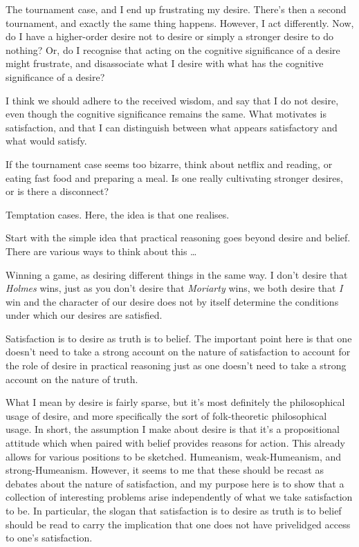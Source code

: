 \documentclass[10pt]{article}
\begin{document}
The tournament case, and I end up frustrating my desire.
There's then a second tournament, and exactly the same thing happens.
However, I act differently.
Now, do I have a higher-order desire not to desire or simply a stronger desire to do nothing?
Or, do I recognise that acting on the cognitive significance of a desire might frustrate, and disassociate what I desire with what has the cognitive significance of a desire?

I think we should adhere to the received wisdom, and say that I do not desire, even though the cognitive significance remains the same.
What motivates is satisfaction, and that I can distinguish between what appears satisfactory and what would satisfy.

If the tournament case seems too bizarre, think about netflix and reading, or eating fast food and preparing a meal.
Is one really cultivating stronger desires, or is there a disconnect?

Temptation cases.
Here, the idea is that one realises.








Start with the simple idea that practical reasoning goes beyond desire and belief.
There are various ways to think about this \dots



Winning a game, as desiring different things in the same way.
I don't desire that \emph{Holmes} wins, just as you don't desire that \emph{Moriarty} wins, we both desire that \emph{I} win and the character of our desire does not by itself determine the conditions under which our desires are satisfied.



Satisfaction is to desire as truth is to belief.
The important point here is that one doesn't need to take a strong account on the nature of satisfaction to account for the role of desire in practical reasoning just as one doesn't need to take a strong account on the nature of truth.

What I mean by desire is fairly sparse, but it's most definitely the philosophical usage of desire, and more specifically the sort of folk-theoretic philosophical usage.
In short, the assumption I make about desire is that it's a propositional attitude which when paired with belief provides reasons for action.
This already allows for various positions to be sketched.
Humeanism, weak-Humeanism, and strong-Humeanism.
However, it seems to me that these should be recast as debates about the nature of satisfaction, and my purpose here is to show that a collection of interesting problems arise independently of what we take satisfaction to be.
In particular, the slogan that satisfaction is to desire as truth is to belief should be read to carry the implication that one does not have privelidged access to one's satisfaction.
\end{document}
